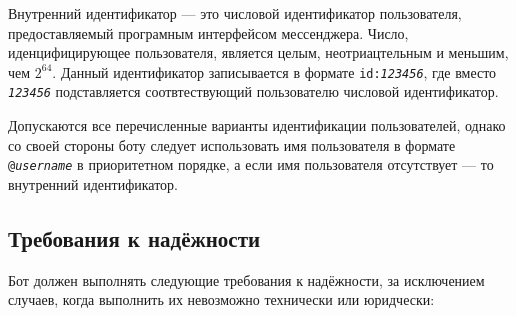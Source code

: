         Внутренний идентификатор --- это числовой идентификатор пользователя, предоставляемый
        програмным интерфейсом мессенджера. Число, иденцифицирующее пользователя, является целым,
        неотриацтельным и меньшим, чем \(2^{64}\). Данный идентификатор записывается в формате
        \texttt{id:\textit{123456}}, где вместо \texttt{\textit{123456}} подставляется соотвтествующий
        пользователю числовой идентификатор.

        Допускаются все перечисленные варианты идентификации пользователей, однако со своей стороны боту
        следует использовать имя пользователя в формате \texttt{@\textit{username}} в приоритетном порядке,
        а если имя пользователя отсутствует --- то внутренний идентификатор.

\subsection{Требования к надёжности}
    \label{sec:req:reliab}
    Бот должен выполнять следующие требования к надёжности, за исключением случаев,
    когда выполнить их невозможно технически или юридчески:
